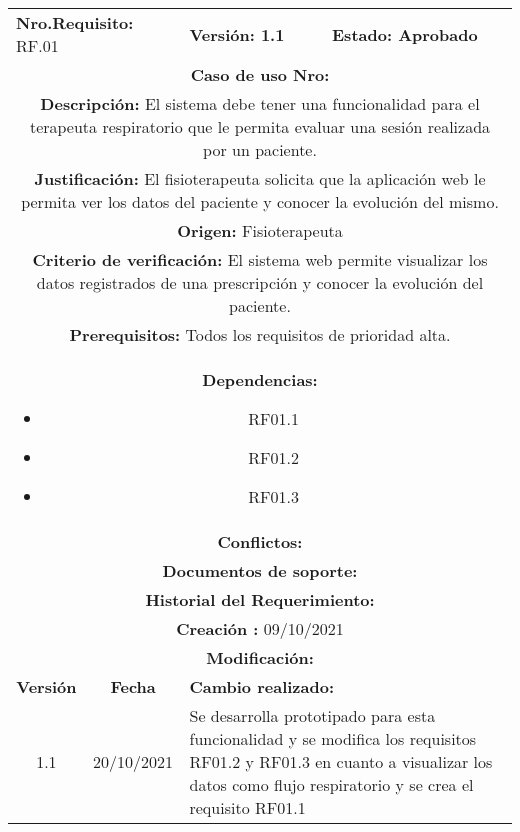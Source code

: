 
\begin{center}
\begin{tabular}{|c|c|p{4cm}|p{4cm}|}
            \hline
            \rowcolor{red} \multicolumn{4}{|c|}{\textbf{Prioridad:} Alta}  \\
            \hline
            \multicolumn{2}{|l}{\textbf{Nro.Requisito: }RF.01} & \multicolumn{1}{|l}{\textbf{Versión: 1.1}} & \multicolumn{1}{|l|}{\textbf{Estado: Aprobado}} \\
            \multicolumn{4}{|p{13cm}|}{\textbf{Caso de uso Nro: }}  \\
            \hline
            \multicolumn{4}{|p{13cm}|}{\textbf{Descripción: } El sistema debe tener una funcionalidad para el terapeuta respiratorio que le permita evaluar una sesión realizada por un paciente. } \\
            \multicolumn{4}{|p{13cm}|}{\textbf{Justificación: } El fisioterapeuta solicita que la aplicación web le permita ver los datos del paciente y conocer la evolución del mismo.} \\ 
            \multicolumn{4}{|p{13cm}|}{\textbf{Origen: }Fisioterapeuta}  \\
            \multicolumn{4}{|p{13cm}|}{\textbf{Criterio de verificación: } El sistema web permite visualizar los datos registrados de una prescripción y conocer la evolución del paciente.  } \\
            \hline
            \multicolumn{4}{|p{13cm}|}{\textbf{Prerequisitos: } Todos los requisitos de prioridad alta. }\\
            \hline \multicolumn{4}{|p{12cm}|}{\textbf{Dependencias: }
                \begin{itemize}
                \item RF01.1
                \item RF01.2
                \item RF01.3
                \end{itemize}}  \\
            \multicolumn{4}{|p{12cm}|}{\textbf{Conflictos: }}  \\
            \hline
            \multicolumn{4}{|p{12cm}|}{\textbf{Documentos de soporte: }}  \\
            \hline
            \multicolumn{4}{|p{12cm}|}{\textbf{Historial del Requerimiento: }}  \\
            \multicolumn{4}{|p{12cm}|}{\textbf{Creación : }09/10/2021}  \\
            \multicolumn{4}{|p{12cm}|}{\textbf{Modificación: }}  \\
             \textbf{Versión} & \textbf{Fecha} & \multicolumn{2}{p{8cm}|}{\textbf{Cambio realizado:}} \\
            \hline
               1.1    &20/10/2021 &   \multicolumn{2}{p{8cm}|}{Se desarrolla prototipado para esta funcionalidad y se modifica los requisitos RF01.2 y RF01.3 en cuanto a visualizar los datos como flujo respiratorio y se crea el requisito RF01.1}
              \\
            \hline
        \end{tabular}


\end{center}
